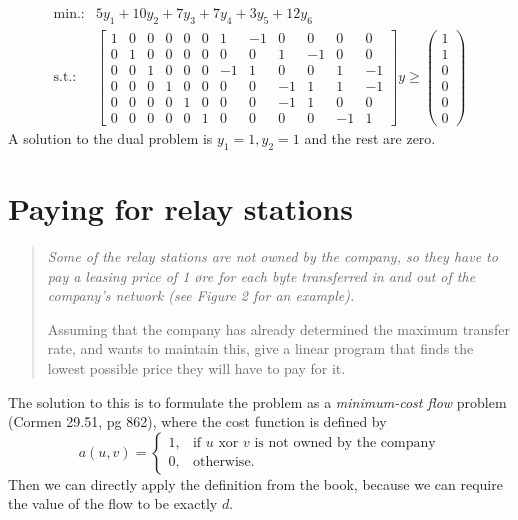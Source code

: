 \documentclass{article}
\begin{document}
\[
\begin{array}{cl}
\textrm{min.:} & 5y_1 + 10y_2 + 7y_3 + 7y_4 + 3y_5 + 12y_6\\
\textrm{s.t.:} &
 \begin{bmatrix}%
 1 & 0 & 0 & 0 & 0 & 0 & 1 & -1 & 0 & 0 & 0 & 0\\
 0 & 1 & 0 & 0 & 0 & 0 & 0 & 0 & 1 & -1 & 0 & 0\\
 0 & 0 & 1 & 0 & 0 & 0 & -1 & 1 & 0 & 0 & 1 & -1\\
 0 & 0 & 0 & 1 & 0 & 0 & 0 & 0 & -1 & 1 & 1 & -1\\
 0 & 0 & 0 & 0 & 1 & 0 & 0 & 0 & -1 & 1 & 0 & 0\\
 0 & 0 & 0 & 0 & 0 & 1 & 0 & 0 & 0 & 0 & -1 & 1
\end{bmatrix}y
\geq
\begin{pmatrix}
  1\\ 1\\ 0\\ 0\\ 0\\ 0
\end{pmatrix}
\end{array}
\]
A solution to the dual problem is $y_1 = 1, y_2 = 1$ and the rest are
zero.

\section*{Paying for relay stations}
\begin{quotation}\itshape
Some of the relay stations are not owned by the company, so they have
to pay a leasing price of 1 øre for each byte transferred in and out
of the company’s network (see Figure 2 for an example).  

Assuming that the company has already determined the maximum transfer
rate, and wants to maintain this, give a linear program that finds the
lowest possible price they will have to pay for it.
\end{quotation}
The solution to this is to formulate the problem as a
\emph{minimum-cost flow} problem (Cormen 29.51, pg 862), where the cost function is defined by
\[
a(u,v) = \left\{\begin{array}{ll}1,&\text{if $u$ xor $v$ is not owned
  by the company}\\ 0,&\text{otherwise.}\end{array}\right.
\]
Then we can directly apply the definition from the book, because we
can require the value of the flow to be exactly $d$.
\end{document}
